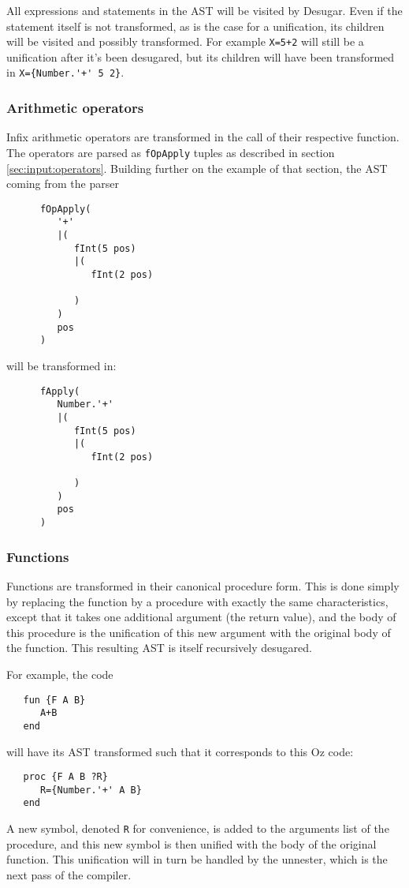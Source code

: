 \documentclass[a4paper]{memoir}
\begin{document}
All expressions and statements in the AST will be visited by Desugar. Even if the statement itself is not transformed, as is the case for a unification, its children will be visited and possibly transformed. For example
\lstinline!X=5+2! will still be a unification after it's been desugared, but its
children will have been transformed in \lstinline!X={Number.'+' 5 2}!.



\subsubsection{Arithmetic operators}
Infix arithmetic operators are transformed in the call of their respective function.
The operators are parsed as \lstinline!fOpApply! tuples as described in section \ref{sec:input:operators}. Building further on the example of that section, the AST coming from the parser

\begin{verbatim}
      fOpApply(
         '+'
         |(
            fInt(5 pos)
            |(
               fInt(2 pos)
               
            )
         )
         pos
      )
\end{verbatim}
will be transformed in:
\begin{verbatim}
      fApply(
         Number.'+'
         |(
            fInt(5 pos)
            |(
               fInt(2 pos)
               
            )
         )
         pos
      )
\end{verbatim}

\subsubsection{Functions}\label{sec:arch:desugar:functions}
Functions are transformed in their canonical procedure form. This is done simply by replacing the function by a procedure with exactly the same characteristics, except that it takes one additional argument (the return value), and the body of this procedure is the unification of this new argument with the original body of the function. This resulting AST is itself recursively desugared.

For example, the code
\begin{lstlisting}
   fun {F A B}
      A+B
   end

\end{lstlisting} 
will have its AST transformed such that it corresponds to this Oz code:
\begin{lstlisting}
   proc {F A B ?R}
      R={Number.'+' A B}
   end
\end{lstlisting} 
A new symbol, denoted \lstinline!R! for convenience, is added to the arguments list of the procedure, and this new symbol is then unified with the body of the original function. This unification will in turn be handled by the unnester, which is the next pass of the compiler.
\end{document}
